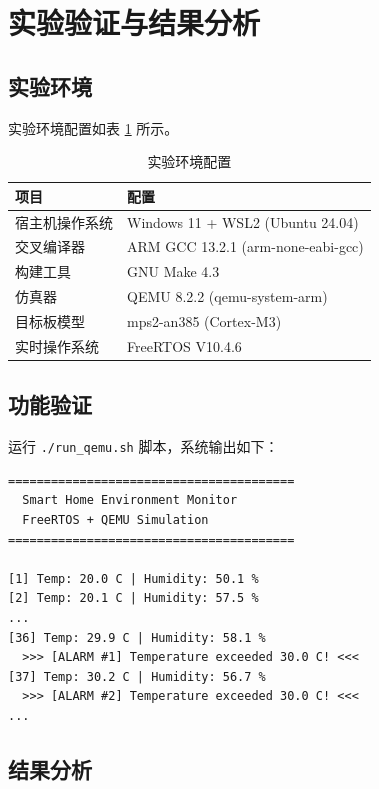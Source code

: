 \documentclass[12pt,a4paper]{ctexart}
\begin{document}
\section{实验验证与结果分析}\label{sec:exp}

\subsection{实验环境}

实验环境配置如表 \ref{tab:env} 所示。

\begin{table}[H]
\centering
\caption{实验环境配置}
\label{tab:env}
\begin{tabular}{ll}
\toprule
\textbf{项目} & \textbf{配置} \\
\midrule
宿主机操作系统 & Windows 11 + WSL2 (Ubuntu 24.04) \\
交叉编译器 & ARM GCC 13.2.1 (arm-none-eabi-gcc) \\
构建工具 & GNU Make 4.3 \\
仿真器 & QEMU 8.2.2 (qemu-system-arm) \\
目标板模型 & mps2-an385 (Cortex-M3) \\
实时操作系统 & FreeRTOS V10.4.6 \\
\bottomrule
\end{tabular}
\end{table}

\subsection{功能验证}

运行 \texttt{./run\_qemu.sh} 脚本，系统输出如下：

\begin{verbatim}
========================================
  Smart Home Environment Monitor
  FreeRTOS + QEMU Simulation
========================================

[1] Temp: 20.0 C | Humidity: 50.1 %
[2] Temp: 20.1 C | Humidity: 57.5 %
...
[36] Temp: 29.9 C | Humidity: 58.1 %
  >>> [ALARM #1] Temperature exceeded 30.0 C! <<<
[37] Temp: 30.2 C | Humidity: 56.7 %
  >>> [ALARM #2] Temperature exceeded 30.0 C! <<<
...
\end{verbatim}

\subsection{结果分析}
\end{document}
